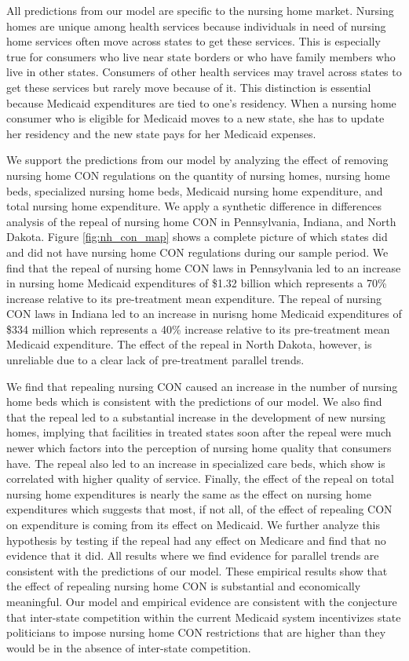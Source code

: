 \documentclass[../Main.tex]{subfiles}
\begin{document}
All predictions from our model are specific to the nursing home market. Nursing homes are unique among health services because individuals in need of nursing home services often move across states to get these services. This is especially true for consumers who live near state borders or who have family members who live in other states. Consumers of other health services may travel across states to get these services but rarely move because of it. This distinction is essential because Medicaid expenditures are tied to one's residency. When a nursing home consumer who is eligible for Medicaid moves to a new state, she has to update her residency and the new state pays for her Medicaid expenses.  

We support the predictions from our model by analyzing the effect of removing nursing home CON regulations on the quantity of nursing homes, nursing home beds, specialized nursing home beds, Medicaid nursing home expenditure, and total nursing home expenditure. We apply a synthetic difference in differences analysis of the repeal of nursing home CON in Pennsylvania, Indiana, and North Dakota. Figure \ref{fig:nh_con_map} shows a complete picture of which states did and did not have nursing home CON regulations during our sample period. We find that the repeal of nursing home CON laws in Pennsylvania led to an increase in nursing home Medicaid expenditures of \$1.32 billion which represents a 70\% increase relative to its pre-treatment mean expenditure. The repeal of nursing CON laws in Indiana led to an increase in nurisng home Medicaid expenditures of \$334 million which represents a 40\% increase relative to its pre-treatment mean Medicaid expenditure. The effect of the repeal in North Dakota, however, is unreliable due to a clear lack of pre-treatment parallel trends. 

We find that repealing nursing CON caused an increase in the number of nursing home beds which is consistent with the predictions of our model. We also find that the repeal led to a substantial increase in the development of new nursing homes, implying that facilities in treated states soon after the repeal were much newer which factors into the perception of nursing home quality that consumers have. The repeal also led to an increase in specialized care beds, which \citet{grabowski2010quality} show is correlated with higher quality of service. Finally, the effect of the repeal on total nursing home expenditures is nearly the same as the effect on nursing home expenditures which suggests that most, if not all, of the effect of repealing CON on expenditure is coming from its effect on Medicaid. We further analyze this hypothesis by testing if the repeal had any effect on Medicare and find that no evidence that it did. All results where we find evidence for parallel trends are consistent with the predictions of our model. These empirical results show that the effect of repealing nursing home CON is substantial and economically meaningful. Our model and empirical evidence are consistent with the conjecture that inter-state competition within the current Medicaid system incentivizes state politicians to impose nursing home CON restrictions that are higher than they would be in the absence of inter-state competition.
\end{document}
